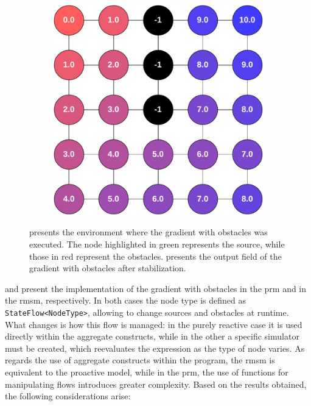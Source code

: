 \begin{figure}[ht!]
\begin{subfigure}[b]{.49\textwidth}
        \caption{}
        \label{fig:gradient-envronment}
    \end{subfigure}
    \hfill
    \begin{subfigure}[b]{.49\textwidth}
        \centering
        \includegraphics[width=\textwidth]{figures/gradient-environment-execution.pdf}
        \caption{}
        \label{fig:gradient-envronment-execution}
    \end{subfigure}
    \caption{ presents the environment where the gradient with obstacles was executed. The node highlighted in green represents the source, while those in red represent the obstacles.  presents the output field of the gradient with obstacles after stabilization.}
    \label{fig:gradient-environment-and-execution}
\end{figure}

 and  present the implementation of the gradient with obstacles in the \ac{prm} and in the \ac{rmsm}, respectively. In both cases the node type is defined as \texttt{StateFlow<NodeType>}, allowing to change sources and obstacles at runtime. What changes is how this flow is managed: in the purely reactive case it is used directly within the aggregate constructs, while in the other a specific simulator must be created, which reevaluates the expression as the type of node varies. As regards the use of aggregate constructs within the program, the \ac{rmsm} is equivalent to the proactive model, while in the \ac{prm}, the use of functions for manipulating flows introduces greater complexity. Based on the results obtained, the following considerations arise:

